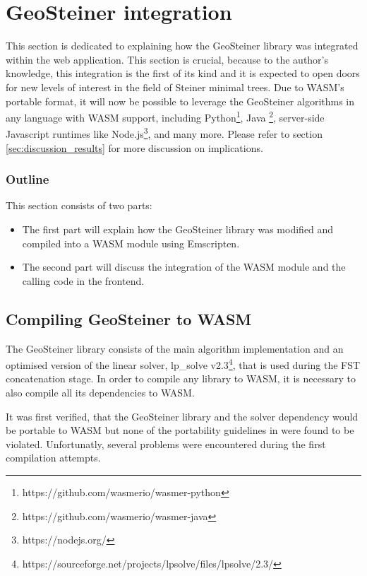\documentclass{l4proj}
\begin{document}
\section{GeoSteiner integration}
\label{sec:geosteiner_integration}
This section is dedicated to explaining how the GeoSteiner library was integrated within the web application. This section is crucial, because to the author's knowledge, this integration is the first of its kind and it is expected to open doors for new levels of interest in the field of Steiner minimal trees. Due to WASM's portable format, it will now be possible to leverage the GeoSteiner algorithms in any language with WASM support, including Python\footnote{https://github.com/wasmerio/wasmer-python}, Java \footnote{https://github.com/wasmerio/wasmer-java}, server-side Javascript runtimes like Node.js\footnote{https://nodejs.org/}, and many more. Please refer to section \ref{sec:discussion_results} for more discussion on implications.

\subsubsection{Outline}
This section consists of two parts:
\begin{itemize}
    \item The first part will explain how the GeoSteiner library was modified and compiled into a WASM module using Emscripten.
    \item The second part will discuss the integration of the WASM module and the calling code in the frontend.
\end{itemize}

\subsection{Compiling GeoSteiner to WASM}

The GeoSteiner library consists of the main algorithm implementation and an optimised version of the linear solver, lp\_solve v2.3\footnote{https://sourceforge.net/projects/lpsolve/files/lpsolve/2.3/}, that is used during the FST concatenation stage.
In order to compile any library to WASM, it is necessary to also compile all its dependencies to WASM.

It was first verified, that the GeoSteiner library and the solver dependency would be portable to WASM but none of the portability guidelines in \cite{Emscripten_portability} were found to be violated.
Unfortunatly, several problems were encountered during the first compilation attempts.
\end{document}
